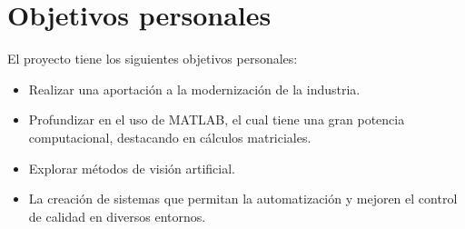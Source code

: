 \section{Objetivos personales}\label{objetivos-personales}

El proyecto tiene los siguientes objetivos personales:

\begin{itemize}
    \tightlist
        \item
            Realizar una aportación a la modernización de la industria.
        \item
            Profundizar en el uso de MATLAB, el cual tiene una gran potencia computacional, destacando en cálculos matriciales.
        \item
            Explorar métodos de visión artificial.
        \item 
            La creación de sistemas que permitan la automatización y mejoren el control de calidad en diversos entornos.
\end{itemize}